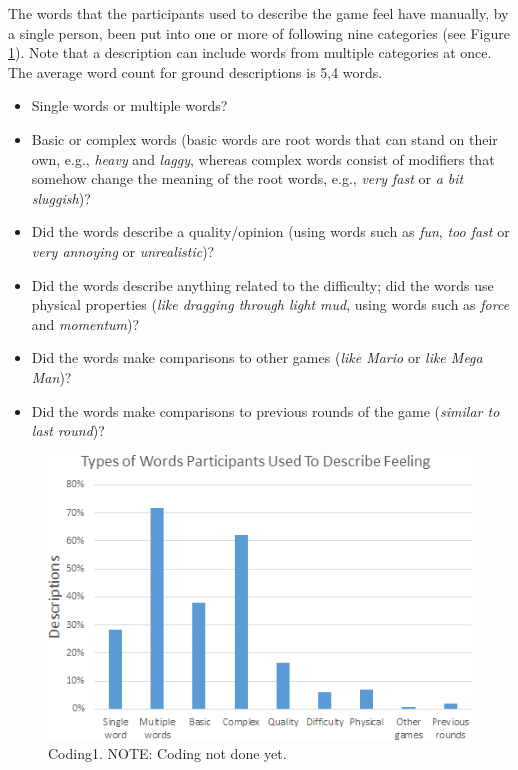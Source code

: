 The words that the participants used to describe the game feel have manually, by a single person, been put into one or more of following nine categories (see Figure \ref{fig:coding1}). Note that a description can include words from multiple categories at once. The average word count for ground descriptions is 5,4 words.
\begin{itemize}[noitemsep,nolistsep]
\item Single words or multiple words?
\item Basic or complex words (basic words are root words that can stand on their own, e.g., \textit{heavy} and \textit{laggy}, whereas complex words consist of modifiers that somehow change the meaning of the root words, e.g., \textit{very fast} or \textit{a bit sluggish})?
\item Did the words describe a quality/opinion (using words such as \textit{fun}, \textit{too fast} or \textit{very annoying} or \textit{unrealistic})?
\item Did the words describe anything related to the difficulty; did the words use physical properties (\textit{like dragging through light mud}, using words such as \textit{force} and \textit{momentum})?
\item Did the words make comparisons to other games (\textit{like Mario} or \textit{like Mega Man})?
\item Did the words make comparisons to previous rounds of the game (\textit{similar to last round})?
\end{itemize}

\begin{figure}[htbp]
\centering
\includegraphics[width=\columnwidth]{Pics/coding1}
\caption{Coding1. NOTE: Coding not done yet.}
\label{fig:coding1}
\end{figure}

